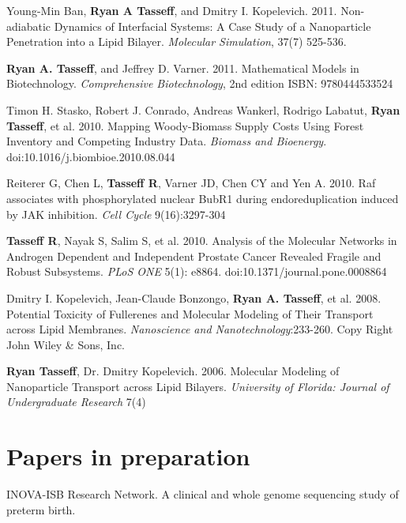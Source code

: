 \documentclass[margin,line]{res}
\begin{document}
\begin{resume}
Young-Min Ban, {\bf Ryan A Tasseff}, and Dmitry I. Kopelevich. 2011.
Non-adiabatic Dynamics of Interfacial Systems: A Case Study of a Nanoparticle Penetration into a Lipid Bilayer.
{\it Molecular Simulation}, 37(7) 525-536. 

{\bf Ryan A. Tasseff}, and Jeffrey D. Varner. 2011.
Mathematical Models in Biotechnology.
{\it Comprehensive Biotechnology}, 2nd edition ISBN: 9780444533524

Timon H. Stasko, Robert J. Conrado, Andreas Wankerl, Rodrigo Labatut, {\bf Ryan Tasseff}, et al. 2010. 
Mapping Woody-Biomass Supply Costs Using Forest Inventory and Competing Industry Data. 
{\it Biomass and Bioenergy}.  doi:10.1016/j.biombioe.2010.08.044

Reiterer G, Chen L, {\bf Tasseff R}, Varner JD, Chen CY and Yen A. 2010.
Raf associates with phosphorylated nuclear BubR1 during endoreduplication 
induced by JAK inhibition.  
{\it Cell Cycle} 9(16):3297-304

{\bf Tasseff R}, Nayak S, Salim S, et al. 2010. 
Analysis of the Molecular Networks in Androgen Dependent and 
Independent Prostate Cancer Revealed Fragile and Robust Subsystems. 
{\it PLoS ONE} 5(1): e8864. doi:10.1371/journal.pone.0008864

Dmitry I. Kopelevich, Jean-Claude Bonzongo, {\bf Ryan A. Tasseff}, et al.
2008. Potential Toxicity of Fullerenes and Molecular Modeling of Their 
Transport across Lipid Membranes. 
{\it Nanoscience and Nanotechnology}:233-260. 
Copy Right John Wiley \& Sons, Inc.

{\bf Ryan Tasseff}, Dr. Dmitry Kopelevich. 2006. 
Molecular Modeling of Nanoparticle Transport 
across Lipid Bilayers.
{\it University of Florida: Journal of Undergraduate Research} 7(4)





\section{\sc Papers in preparation}
INOVA-ISB Research Network.
A clinical and whole genome sequencing study of preterm birth.


\end{resume}
\end{document}
